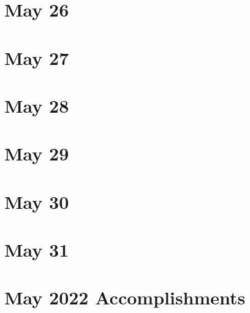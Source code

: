 \section{May 26}

\section{May 27}

\section{May 28}

\section{May 29}

\section{May 30}

\section{May 31}

\section{May 2022 Accomplishments}
